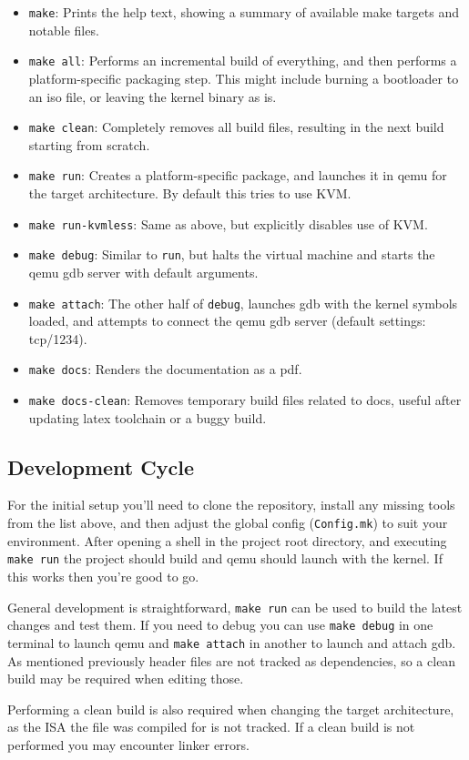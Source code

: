 \begin{itemize}
    \item \verb|make|: Prints the help text, showing a summary of available make targets and notable files.
    \item \verb|make all|: Performs an incremental build of everything, and then performs a platform-specific packaging step. This might include burning a bootloader to an iso file, or leaving the kernel binary as is.
    \item \verb|make clean|: Completely removes all build files, resulting in the next build starting from scratch.
    \item \verb|make run|: Creates a platform-specific package, and launches it in qemu for the target architecture. By default this tries to use KVM.
    \item \verb|make run-kvmless|: Same as above, but explicitly disables use of KVM.
    \item \verb|make debug|: Similar to \verb|run|, but halts the virtual machine and starts the qemu gdb server with default arguments.
    \item \verb|make attach|: The other half of \verb|debug|, launches gdb with the kernel symbols loaded, and attempts to connect the qemu gdb server (default settings: tcp/1234).
    \item \verb|make docs|: Renders the documentation as a pdf.
    \item \verb|make docs-clean|: Removes temporary build files related to docs, useful after updating latex toolchain or a buggy build.
\end{itemize}

\subsection{Development Cycle}
For the initial setup you'll need to clone the repository, install any missing tools from the list above, and then adjust the global config (\verb|Config.mk|) to suit your environment. After opening a shell in the project root directory, and executing \verb|make run| the project should build and qemu should launch with the kernel. If this works then you're good to go.

General development is straightforward, \verb|make run| can be used to build the latest changes and test them. If you need to debug you can use \verb|make debug| in one terminal to launch qemu and \verb|make attach| in another to launch and attach gdb. As mentioned previously header files are not tracked as dependencies, so a clean build may be required when editing those.

Performing a clean build is also required when changing the target architecture, as the ISA the file was compiled for is not tracked. If a clean build is not performed you may encounter linker errors.
